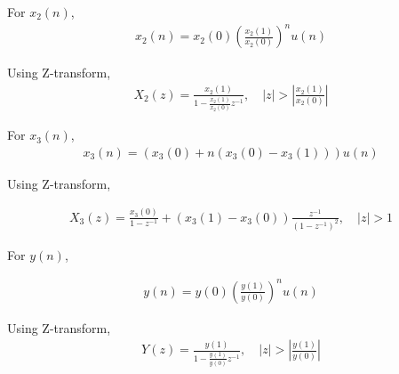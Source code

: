 \documentclass[journal,12pt,twocolumn]{IEEEtran}
\providecommand{\brak}[1]{\ensuremath{\left(#1\right)}}
\theoremstyle{remark}
\providecommand{\abs}[1]{\left\vert#1\right\vert}
\begin{document}
For $x_2(n)$,
\begin{align}
x_2(n) = x_2(0)\brak{\frac{x_2(1)}{x_2(0)}}^n u(n)
\end{align}

Using Z-transform,
\begin{align}
X_2(z) = \frac{x_2(1)}{1-\frac{x_2(1)}{x_2(0)}z^{-1}},  \quad \abs{z}>\abs{\frac{x_2(1)}{x_2(0)}}
\end{align}

For $x_3(n)$,
\begin{align}
x_3(n) = \brak{x_3(0) + n\brak{x_3(0) - x_3(1)}}u(n)
\end{align}

Using Z-transform,

\begin{align}
X_3(z) = \frac{x_3(0)}{1-z^{-1}} + \brak{x_3(1) - x_3(0)}\frac{z^{-1}}{(1-z^{-1})^2} ,
\quad |z| > 1
\end{align}

For $y(n)$,

\begin{align}
y(n) = y(0)\brak{\frac{y(1)}{y(0)}}^n u(n)
\end{align}

Using Z-transform,
\begin{align}
Y(z) = \frac{y(1)}{1-\frac{y(1)}{y(0)}z^{-1}}, \quad \abs{z}>\abs{\frac{y(1)}{y(0)}}
\end{align}
\end{document}
